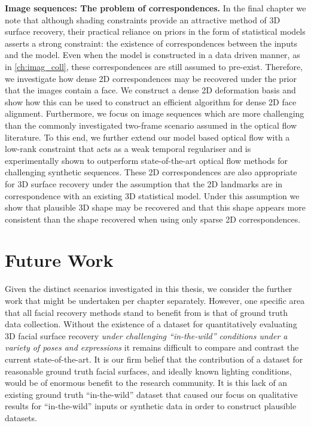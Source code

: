 \textbf{Image sequences: The problem of correspondences.}
In the final chapter we note that although shading constraints provide an
attractive method of 3D surface recovery, their practical reliance on
priors in the form of statistical models asserts a strong constraint: the 
existence of correspondences between the inputs and the model. Even when the
model is constructed in a data driven manner, as in \cref{ch:imag_coll},
these correspondences are still assumed to pre-exist. Therefore, we investigate
how dense 2D correspondences may be recovered under the prior that the images
contain a face. We construct a dense 2D deformation basis and show how this can
be used to construct an efficient algorithm for dense 2D face alignment. 
Furthermore, we focus on image sequences which are more challenging than the
commonly investigated two-frame scenario assumed in the optical flow literature.
To this end, we further extend our model based optical flow with a low-rank
constraint that acts as a weak temporal regulariser and is experimentally shown
to outperform state-of-the-art optical flow methods for challenging synthetic
sequences. These 2D correspondences are also appropriate for 3D surface recovery
under the assumption that the 2D landmarks are in correspondence with an
existing 3D statistical model. Under this assumption we show that plausible
3D shape may be recovered and that this shape appears more consistent than
the shape recovered when using only sparse 2D correspondences.
\section{Future Work}
Given the distinct scenarios investigated in this thesis, we consider
the further work that might be undertaken per chapter separately. However,
one specific area that all facial recovery methods stand to benefit from
is that of ground truth data collection. Without the existence of a dataset
for quantitatively evaluating 3D facial surface recovery \textit{under
challenging ``in-the-wild'' conditions under a variety of poses and expressions}
it remains difficult to compare and contrast the current state-of-the-art.
It is our firm belief that the contribution of a dataset for reasonable
ground truth facial surfaces, and ideally known lighting conditions, would
be of enormous benefit to the research community. It is this lack of an existing
ground truth ``in-the-wild'' dataset that caused our focus on qualitative
results for ``in-the-wild'' inputs or synthetic data in order to construct 
plausible datasets.
